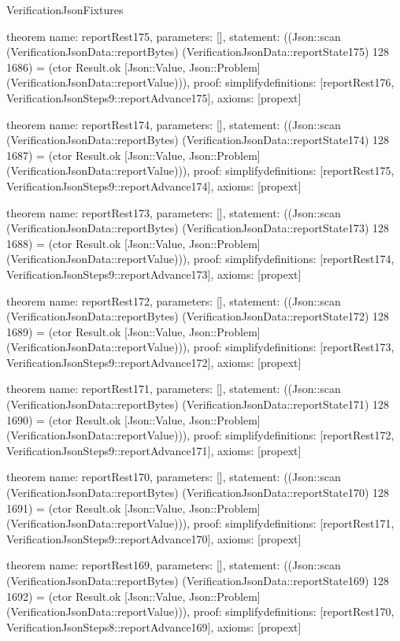 \begin{lexlean}{VerificationJsonFixtures}
\begin{semanticmodule}
theorem{
  name: reportRest175,
  parameters: [],
  statement: ((Json::scan (VerificationJsonData::reportBytes) (VerificationJsonData::reportState175) 128 1686) = (ctor Result.ok [Json::Value, Json::Problem] (VerificationJsonData::reportValue))),
  proof: simplify{definitions: [reportRest176, VerificationJsonSteps9::reportAdvance175]},
  axioms: [propext]
}

theorem{
  name: reportRest174,
  parameters: [],
  statement: ((Json::scan (VerificationJsonData::reportBytes) (VerificationJsonData::reportState174) 128 1687) = (ctor Result.ok [Json::Value, Json::Problem] (VerificationJsonData::reportValue))),
  proof: simplify{definitions: [reportRest175, VerificationJsonSteps9::reportAdvance174]},
  axioms: [propext]
}

theorem{
  name: reportRest173,
  parameters: [],
  statement: ((Json::scan (VerificationJsonData::reportBytes) (VerificationJsonData::reportState173) 128 1688) = (ctor Result.ok [Json::Value, Json::Problem] (VerificationJsonData::reportValue))),
  proof: simplify{definitions: [reportRest174, VerificationJsonSteps9::reportAdvance173]},
  axioms: [propext]
}

theorem{
  name: reportRest172,
  parameters: [],
  statement: ((Json::scan (VerificationJsonData::reportBytes) (VerificationJsonData::reportState172) 128 1689) = (ctor Result.ok [Json::Value, Json::Problem] (VerificationJsonData::reportValue))),
  proof: simplify{definitions: [reportRest173, VerificationJsonSteps9::reportAdvance172]},
  axioms: [propext]
}

theorem{
  name: reportRest171,
  parameters: [],
  statement: ((Json::scan (VerificationJsonData::reportBytes) (VerificationJsonData::reportState171) 128 1690) = (ctor Result.ok [Json::Value, Json::Problem] (VerificationJsonData::reportValue))),
  proof: simplify{definitions: [reportRest172, VerificationJsonSteps9::reportAdvance171]},
  axioms: [propext]
}

theorem{
  name: reportRest170,
  parameters: [],
  statement: ((Json::scan (VerificationJsonData::reportBytes) (VerificationJsonData::reportState170) 128 1691) = (ctor Result.ok [Json::Value, Json::Problem] (VerificationJsonData::reportValue))),
  proof: simplify{definitions: [reportRest171, VerificationJsonSteps9::reportAdvance170]},
  axioms: [propext]
}

theorem{
  name: reportRest169,
  parameters: [],
  statement: ((Json::scan (VerificationJsonData::reportBytes) (VerificationJsonData::reportState169) 128 1692) = (ctor Result.ok [Json::Value, Json::Problem] (VerificationJsonData::reportValue))),
  proof: simplify{definitions: [reportRest170, VerificationJsonSteps8::reportAdvance169]},
  axioms: [propext]
}


\end{semanticmodule}
\end{lexlean}
